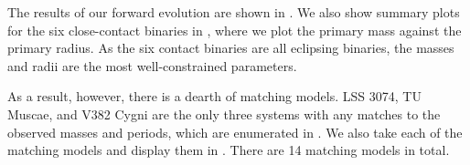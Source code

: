 The results of our forward evolution are shown in . We also show summary plots for the six close-contact binaries in , where we plot the primary mass against the primary radius. As the six contact binaries are all eclipsing binaries, the masses and radii are the most well-constrained parameters.

As a result, however, there is a dearth of matching models. LSS 3074, TU Muscae, and V382 Cygni are the only three systems with any matches to the observed masses and periods, which are enumerated in . We also take each of the matching models and display them in . There are 14 matching models in total.

\begin{table}
    \centering


\end{table}
